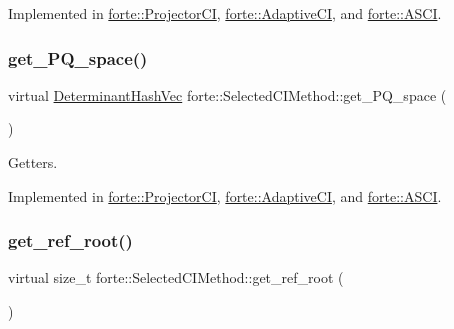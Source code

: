 Implemented in \mbox{\hyperlink{classforte_1_1_projector_c_i_a3c3dd33031ea7f0764c34db25e8d03a4}{forte\+::\+Projector\+CI}}, \mbox{\hyperlink{classforte_1_1_adaptive_c_i_ab96222faf4f633fac906b24c7b68d288}{forte\+::\+Adaptive\+CI}}, and \mbox{\hyperlink{classforte_1_1_a_s_c_i_a7b0cff30856eb70d451216e5039e15ee}{forte\+::\+A\+S\+CI}}.

\mbox{\label{classforte_1_1_selected_c_i_method_a2c29d8700d6887860850f77b9246ec9f}} 
\subsubsection{\texorpdfstring{get\+\_\+\+P\+Q\+\_\+space()}{get\_PQ\_space()}}
{\footnotesize\ttfamily virtual \mbox{\hyperlink{classforte_1_1_determinant_hash_vec}{Determinant\+Hash\+Vec}} forte\+::\+Selected\+C\+I\+Method\+::get\+\_\+\+P\+Q\+\_\+space (\begin{DoxyParamCaption}{ }\end{DoxyParamCaption})\hspace{0.3cm}{\ttfamily [pure virtual]}}



Getters. 



Implemented in \mbox{\hyperlink{classforte_1_1_projector_c_i_aa666615f222bd2263b1199910b2bbbcc}{forte\+::\+Projector\+CI}}, \mbox{\hyperlink{classforte_1_1_adaptive_c_i_af7e800fcfe0d1c2b674cf8cd2c4f41d0}{forte\+::\+Adaptive\+CI}}, and \mbox{\hyperlink{classforte_1_1_a_s_c_i_abe4f88df4acd5e486cc1e9d43254bc0d}{forte\+::\+A\+S\+CI}}.

\mbox{\label{classforte_1_1_selected_c_i_method_aa95ed581568b2d580c17ab166e85a11a}} 
\subsubsection{\texorpdfstring{get\+\_\+ref\+\_\+root()}{get\_ref\_root()}}
{\footnotesize\ttfamily virtual size\+\_\+t forte\+::\+Selected\+C\+I\+Method\+::get\+\_\+ref\+\_\+root (\begin{DoxyParamCaption}{ }\end{DoxyParamCaption})\hspace{0.3cm}{\ttfamily [pure virtual]}}



